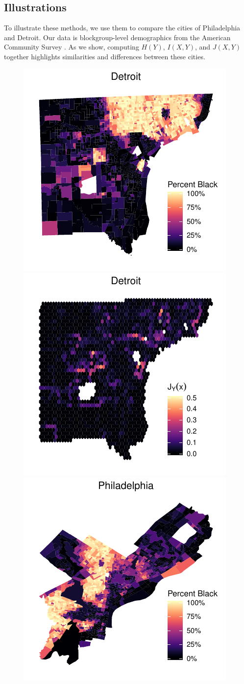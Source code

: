 \documentclass[english]{scrartcl}
\begin{document}
	\subsection{Illustrations}
			To illustrate these methods, we use them to compare the cities of Philadelphia and Detroit. Our data is blockgroup-level demographics from the American Community Survey \cite{CensusRace}. As we show, computing $H(Y)$, $I(X,Y)$, and $J(X,Y)$ together highlights similarities and differences between these cities. 
			\begin{figure}
				\includegraphics[width = .5\textwidth]{figs/Detroit_percent_black.pdf}
				\includegraphics[width = .5\textwidth]{figs/Detroit_grid.pdf} \\
				\includegraphics[width = .5\textwidth]{figs/Philadelphia_percent_black.pdf}

\end{figure}
\end{document}
